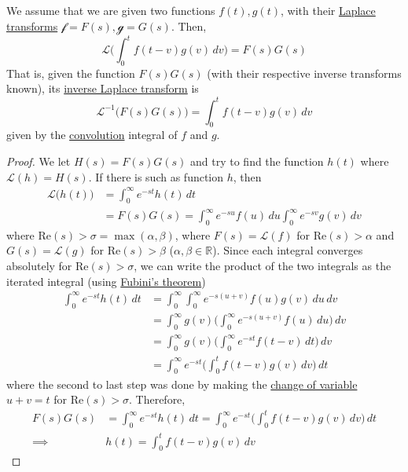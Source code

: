\documentclass{article}
\newcounter{theorem}[section]
\begin{document}
    \begin{theorem}
      \label{thm:inverse-laplace-transforms-of-products-of}
    We assume that we are given two functions $f(t), g(t)$, with their \hyperref[def:laplace-transform]{Laplace transforms} $\mathcal{f} = F(s), \mathcal{g} = G(s)$. Then, 
    \begin{equation}
      \mathcal{L}\bigg(\int_0^t f(t-v) g(v)\,dv \bigg) = F(s)G(s)
    \end{equation}
    That is, given the function $F(s) G(s)$ (with their respective inverse transforms known), its \hyperref[def:inverse-laplace-transform]{inverse Laplace transform} is
    \begin{equation}
      \mathcal{L}^{-1} \big( F(s) G(s)\big) = \int_0^t f(t-v) g(v)\,dv
    \end{equation}
    given by the \hyperref[real-thm:convolution]{convolution} integral of $f$ and $g$. 
    \end{theorem}
    \begin{proof}
    We let $H(s) = F(s) G(s)$ and try to find the function $h(t)$ where $\mathcal{L}(h) = H(s)$. If there is such as function $h$, then 
    \begin{align*}
        \mathcal{L}\big(h(t)\big) & = \int_0^\infty e^{-st} h(t)\,dt \\
        & = F(s) G(s) = \int_0^\infty e^{-su} f(u) \,du \int_0^\infty e^{-sv} g(v)\,dv
    \end{align*}
    where Re$(s)>\sigma = \max{(\alpha, \beta)}$, where $F(s) = \mathcal{L}(f)$ for Re$(s)>\alpha$ and $G(s) = \mathcal{L}(g)$ for Re$(s)>\beta$ ($\alpha, \beta \in \mathbb{R}$). Since each integral converges absolutely for Re$(s) > \sigma$, we can write the product of the two integrals as the iterated integral (using \hyperref[mt-thm:fubinis-theorem]{Fubini's theorem}) 
    \begin{align*}
        \int_0^\infty e^{-st} h(t) \,dt & = \int_0^\infty \int_0^\infty e^{-s(u+v)} f(u) g(v)\,du \,dv \\
        & = \int_0^\infty g(v) \bigg(\int_0^\infty e^{-s(u+v)} f(u)\,du\bigg)\,dv \\
        & = \int_0^\infty g(v) \bigg( \int_0^\infty e^{-st} f(t-v) \,dt \bigg)\,dv \\
        & = \int_0^\infty e^{-st} \bigg( \int_0^t f(t-v) g(v)\,dv \bigg) \,dt
    \end{align*}
    where the second to last step was done by making the \hyperref[real-thm:change-of-variable]{change of variable} $u+v = t$ for Re$(s) > \sigma$. Therefore, 
    \begin{align*}
        F(s) G(s) & = \int_0^\infty e^{-st} h(t) \,dt = \int_0^\infty e^{-st} \bigg( \int_0^t f(t-v) g(v)\,dv \bigg) \,dt \\
        \implies & h(t) = \int_0^t f(t-v) g(v)\,dv
    \end{align*}
    \end{proof}
\end{document}
